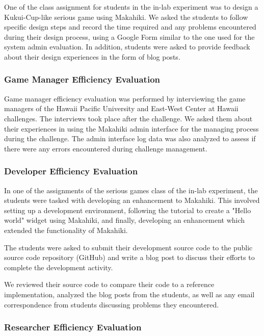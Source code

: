 \documentclass{sigchi}
\begin{document}
One of the class assignment for students in the in-lab experiment was to design a
Kukui-Cup-like serious game using Makahiki. We asked the students to follow specific
design steps and record the time required and any problems encountered during
their design process, using a Google Form similar to the one used for the system admin
evaluation. In addition, students were asked to provide feedback about their
design experiences in the form of blog posts.


\subsubsection{Game Manager Efficiency Evaluation}

Game manager efficiency evaluation was performed by interviewing the
game managers of the Hawaii Pacific University and East-West Center at
Hawaii challenges. The interviews took place after the challenge. We
asked them about their experiences in using the Makahiki admin
interface for the managing process during the challenge. The admin
interface log data was also analyzed to assess if there were any errors
encountered during challenge management.

\subsubsection{Developer Efficiency Evaluation}

In one of the assignments of the serious games class of the in-lab experiment,
the students were tasked with developing an enhancement to Makahiki. This
involved setting up a development environment, following the tutorial
to create a "Hello world" widget using Makahiki, and finally,
developing an enhancement which extended the functionality of Makahiki.

The students were asked to submit their development source code to the
public source code repository (GitHub) and write a blog post to
discuss their efforts to complete the development activity.

We reviewed their source code to compare their code to a reference
implementation, analyzed the blog posts from the students, as well as
any email correspondence from students discussing problems they encountered.

\subsubsection{Researcher Efficiency Evaluation}
\end{document}

